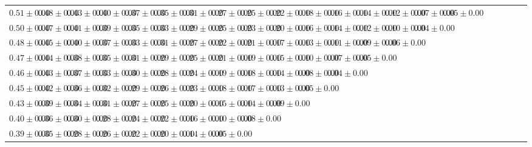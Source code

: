\begin{table}[ht]
{{\begin{adjustbox}{width=\textwidth}
\begin{tabular}{ccccccccccccccccccccccc}
$0.51 \pm 0.00$ & $0.48 \pm 0.00$ & $0.43 \pm 0.00$ & $0.40 \pm 0.00$ & $0.37 \pm 0.00$ & $0.35 \pm 0.00$ & $0.31 \pm 0.00$ & $0.27 \pm 0.00$ & $0.25 \pm 0.00$ & $0.22 \pm 0.00$ & $0.18 \pm 0.00$ & $0.16 \pm 0.00$ & $0.14 \pm 0.00$ & $0.12 \pm 0.00$ & $0.07 \pm 0.00$ & $0.05 \pm 0.00$ &  &  &  &  &  &  &  \\
$0.50 \pm 0.00$ & $0.47 \pm 0.00$ & $0.41 \pm 0.00$ & $0.39 \pm 0.00$ & $0.35 \pm 0.00$ & $0.33 \pm 0.00$ & $0.29 \pm 0.00$ & $0.25 \pm 0.00$ & $0.23 \pm 0.00$ & $0.20 \pm 0.00$ & $0.16 \pm 0.00$ & $0.14 \pm 0.00$ & $0.12 \pm 0.00$ & $0.10 \pm 0.00$ & $0.04 \pm 0.00$ &  &  &  &  &  &  &  &  \\
$0.48 \pm 0.00$ & $0.45 \pm 0.00$ & $0.40 \pm 0.00$ & $0.37 \pm 0.00$ & $0.33 \pm 0.00$ & $0.31 \pm 0.00$ & $0.27 \pm 0.00$ & $0.22 \pm 0.00$ & $0.21 \pm 0.00$ & $0.17 \pm 0.00$ & $0.13 \pm 0.00$ & $0.11 \pm 0.00$ & $0.09 \pm 0.00$ & $0.06 \pm 0.00$ &  &  &  &  &  &  &  &  &  \\
$0.47 \pm 0.00$ & $0.44 \pm 0.00$ & $0.38 \pm 0.00$ & $0.35 \pm 0.00$ & $0.31 \pm 0.00$ & $0.29 \pm 0.00$ & $0.25 \pm 0.00$ & $0.21 \pm 0.00$ & $0.19 \pm 0.00$ & $0.15 \pm 0.00$ & $0.10 \pm 0.00$ & $0.07 \pm 0.00$ & $0.05 \pm 0.00$ &  &  &  &  &  &  &  &  &  &  \\
$0.46 \pm 0.00$ & $0.43 \pm 0.00$ & $0.37 \pm 0.00$ & $0.33 \pm 0.00$ & $0.30 \pm 0.00$ & $0.28 \pm 0.00$ & $0.24 \pm 0.00$ & $0.19 \pm 0.00$ & $0.18 \pm 0.00$ & $0.14 \pm 0.00$ & $0.08 \pm 0.00$ & $0.04 \pm 0.00$ &  &  &  &  &  &  &  &  &  &  &  \\
$0.45 \pm 0.00$ & $0.42 \pm 0.00$ & $0.36 \pm 0.00$ & $0.32 \pm 0.00$ & $0.29 \pm 0.00$ & $0.26 \pm 0.00$ & $0.23 \pm 0.00$ & $0.18 \pm 0.00$ & $0.17 \pm 0.00$ & $0.13 \pm 0.00$ & $0.05 \pm 0.00$ &  &  &  &  &  &  &  &  &  &  &  &  \\
$0.43 \pm 0.00$ & $0.39 \pm 0.00$ & $0.34 \pm 0.00$ & $0.31 \pm 0.00$ & $0.27 \pm 0.00$ & $0.25 \pm 0.00$ & $0.20 \pm 0.00$ & $0.15 \pm 0.00$ & $0.14 \pm 0.00$ & $0.09 \pm 0.00$ &  &  &  &  &  &  &  &  &  &  &  &  &  \\
$0.40 \pm 0.00$ & $0.36 \pm 0.00$ & $0.30 \pm 0.00$ & $0.28 \pm 0.00$ & $0.24 \pm 0.00$ & $0.22 \pm 0.00$ & $0.16 \pm 0.00$ & $0.10 \pm 0.00$ & $0.08 \pm 0.00$ &  &  &  &  &  &  &  &  &  &  &  &  &  &  \\
$0.39 \pm 0.00$ & $0.35 \pm 0.00$ & $0.28 \pm 0.00$ & $0.26 \pm 0.00$ & $0.22 \pm 0.00$ & $0.20 \pm 0.00$ & $0.14 \pm 0.00$ & $0.05 \pm 0.00$ &  &  &  &  &  &  &  &  &  &  &  &  &  &  &  \\

\end{tabular}
\end{adjustbox}}}
\end{table}
